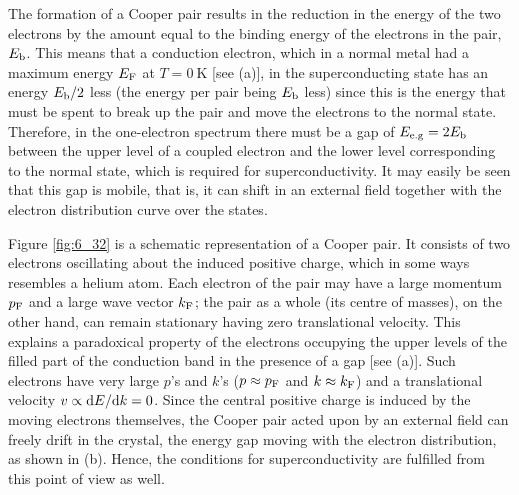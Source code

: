 The formation of a Cooper pair results in the reduction in the energy of the two electrons by the amount equal to the binding energy of the electrons in the pair, $E_{\text{b}}$. This means that a conduction electron, which in a normal metal had a maximum energy $E_{\text{F}}$ at $T=\SI{0}{\kelvin}$ [see (a)], in the superconducting state has an energy $E_{\text{b}}/2$ less (the energy per pair being $E_{\text{b}}$ less) since this is the energy that must be spent to break up the pair and move the electrons to the normal state. Therefore, in the one-electron spectrum there must be a gap of $E_{\text{e.g}}=2E_{\text{b}}$ between the upper level of a coupled electron and the lower level corresponding to the normal state, which is required
for superconductivity. It may easily be seen that this gap is mobile, that is, it can shift in an external field together with the electron distribution curve over the states.

Figure \ref{fig:6_32} is a schematic representation of a Cooper pair. It consists of two electrons oscillating about the induced positive charge, which in some ways resembles a helium atom. Each electron of the pair may have a large momentum $p_{\text{F}}$ and a large wave vector $k_{\text{F}}$; the pair as a whole (its centre of masses), on the other hand, can remain stationary having zero translational velocity. This explains a paradoxical property of the electrons occupying the upper levels of the filled part of the conduction band in the presence of a gap [see (a)]. Such electrons have very large $p$'s and $k$'s ($p\approx p_{\text{F}}$ and $k\approx k_{\text{F}}$) and a translational velocity $v\propto\mathrm{d} E/\mathrm{d} k=0$. Since the central positive charge is induced by the moving electrons themselves, the Cooper pair acted upon by an external field can freely drift in the crystal, the energy gap moving with the electron distribution, as shown in (b). Hence, the conditions for superconductivity are fulfilled from this point of view as well.

